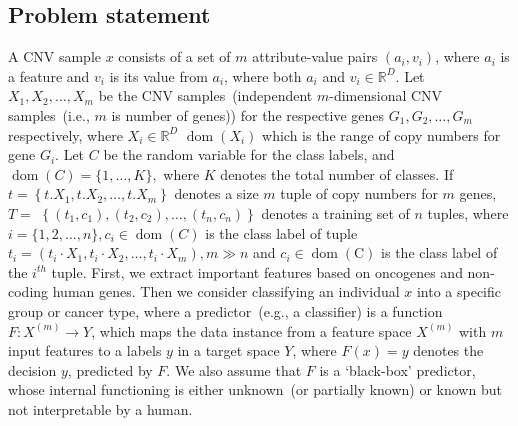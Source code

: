 \subsection{Problem statement}
A CNV sample $x$ consists of a set of $m$ attribute-value pairs $\left(a_{i}, v_{i}\right)$, where $a_i$ is a feature and $v_i$ is its value from $a_{i}$, where both $a_{i}$ and $v_i \in \mathbb{R}^{D}$. %
Let $X_{1}, X_{2}, \ldots, X_{m}$ be the CNV samples~(independent $m$-dimensional CNV samples~(i.e., $m$ is number of genes)) for the respective genes $G_{1}, G_{2}, \ldots, G_{m}$ respectively, where $X_{i} \in \mathbb{R}^{D}$ $\operatorname{dom}\left(X_{i}\right)$ which is the range of copy numbers for gene $G_{i}$. Let $C$ be the random variable for the class labels, and $\operatorname{dom}(C)=\{1, \ldots, K\},$ where $K$ denotes the total number of classes. If $t=\left\{t . X_{1}, t . X_{2}, \ldots, t . X_{m}\right\}$ denotes a size $m$ tuple of copy numbers for $m$ genes, $T=$ $\left\{\left(t_{1}, c_{1}\right),\left(t_{2}, c_{2}\right), \ldots,\left(t_{n}, c_{n}\right)\right\}$ denotes a training set of $n$ tuples, where $i=\{1,2, \ldots, n\}, c_{i} \in \operatorname{dom}(C)$ is the class label of tuple $t_{i} 
=\left(t_{i} \cdot X_{1}, t_{i} \cdot X_{2}, \ldots, t_{i} \cdot X_{m}\right), m \gg n$ and $c_{i} \in \operatorname{dom}(\mathrm{C})$ is the class label of the $i^{th}$ tuple. 
First, we extract important features based on oncogenes and non-coding human genes. 
Then we consider classifying an individual $x$ into a specific group or cancer type, where a predictor~(e.g., a classifier) is a function $F: {X}^{(m)} \rightarrow {Y}$, which maps the data instance from a feature space ${X}^{(m)}$ with $m$ input features to a labels $y$ in a target space ${Y}$, where $F(x)=y$ denotes the decision $y$, predicted by $F$. We also assume that $F$ is a `black-box' predictor, whose internal functioning is either unknown~(or partially known) or known but not interpretable by a human. 
 
